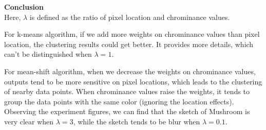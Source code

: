 \documentclass[12pt]{article}
\begin{document}
\textbf{Conclusion}\\

Here, $\lambda$ is defined as the ratio of pixel location and chrominance values. 

For k-means algorithm, if we add more weights on chrominance values than pixel location, the clustering results could get better. It provides more details, which can't be distinguished when $\lambda = 1$. 

For mean-shift algorithm, when we decrease the weights on chrominance values, outputs tend to be more sensitive on pixel locations, which leads to the clustering of nearby data points. When chrominance values raise the weights, it tends to group the data points with the same color (ignoring the location effects). Observing the experiment figures, we can find that the sketch of Mushroom is very clear when $\lambda = 3$, while the sketch tends to be blur when $\lambda = 0.1$.



\end{document}
